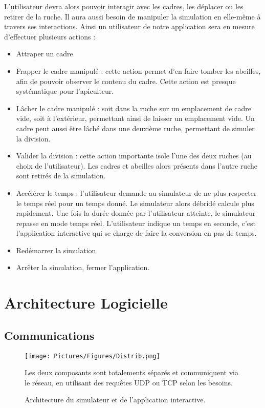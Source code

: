 		L'utilisateur devra alors pouvoir interagir avec les cadres, les déplacer ou les retirer de la ruche. Il aura aussi besoin de manipuler la simulation en elle-même à travers ses interactions. Ainsi un utilisateur de notre application sera en mesure d'effectuer plusieurs actions :
		\begin{itemize}
			\item Attraper un cadre
			\item Frapper le cadre manipulé : cette action permet d'en faire tomber les abeilles, afin de pouvoir observer le contenu du cadre. Cette action est presque systématique pour l'apiculteur.
			\item Lâcher le cadre manipulé : soit dans la ruche sur un emplacement de cadre vide, soit à l'extérieur, permettant ainsi de laisser un emplacement vide. Un cadre peut aussi être lâché dans une deuxième ruche, permettant de simuler la division.
			\item Valider la division : cette action importante isole l'une des deux ruches (au choix de l'utilisateur). Les cadres et abeilles alors présents dans l'autre ruche sont retirés de la simulation.
			\item Accélérer le temps : l'utilisateur demande au simulateur de ne plus respecter le temps réel pour un temps donné. Le simulateur alors débridé calcule plus rapidement. Une fois la durée donnée par l'utilisateur atteinte, le simulateur repasse en mode temps réel. L'utilisateur indique un temps en seconde, c'est l'application interactive qui se charge de faire la conversion en pas de temps.
			\item Redémarrer la simulation
			\item Arrêter la simulation, fermer l'application.		
		\end{itemize}
		
		

	\section{Architecture Logicielle}
	
	\subsection{Communications}

	\begin{figure}
	\centering
	\texttt{[image: Pictures/Figures/Distrib.png]}
	\caption{Architecture du simulateur et de l'application interactive.}{Les deux composants sont totalements séparés et communiquent via le réseau, en utilisant des requêtes UDP ou TCP selon les besoins.}
	\label{archi}
	\end{figure}
	

